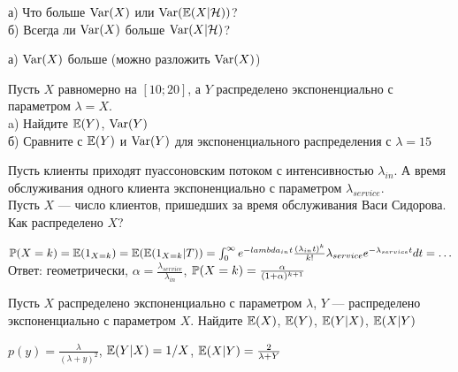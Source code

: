\begin{solution}
\begin{solution}
\begin{solution}
\begin{solution}
\begin{solution}
\begin{solution}
\begin{solution}
\begin{solution}
\end{solution}

\begin{problem}
а) Что больше $\Var(X)$ или $\Var(\E(X|\mathcal{H}))$? \\
б) Всегда ли $\Var(X)$ больше $\Var(X|\mathcal{H})$? 
\end{problem} 
\begin{solution} 

 а) $\Var(X)$ больше (можно разложить $\Var(X)$)
\end{solution}

\begin{problem}
Пусть $X$ равномерно на $[10;20]$, а $Y$ распределено экспоненциально с параметром $\lambda=X$. \\
a) Найдите $\E(Y)$, $\Var(Y)$ \\
б) Сравните с $\E(Y)$ и $\Var(Y)$ для экспоненциального распределения с $\lambda=15$ 
\end{problem} 
\begin{solution} 

\end{solution}

\begin{problem}
Пусть клиенты приходят пуассоновским потоком с интенсивностью $\lambda_{in}$. А время обслуживания одного клиента экспоненциально с параметром $\lambda_{service}$. \\
Пусть $X$ --- число клиентов, пришедших за время обслуживания Васи Сидорова. \\
Как распределено $X$? 
\end{problem} 
\begin{solution} 

$\P(X=k)=\E(1_{X=k})=\E(\E(1_{X=k}|T))=\int_{0}^{\infty}e^{-lambda_{in}t}\frac{(\lambda_{in}t)^{k}}{k!}\lambda_{service}e^{-\lambda_{service}t}dt=\ldots$ \\
Ответ: геометрически, $\alpha=\frac{\lambda_{service}}{\lambda_{in}}$, $\P(X=k)=\frac{\alpha}{(1+\alpha)^{k+1}}$ 
\end{solution}

\begin{problem}
Пусть $X$ распределено экспоненциально с параметром $\lambda$, $Y$ --- распределено экспоненциально с параметром $X$. Найдите $\E(X)$, $\E(Y)$, $\E(Y|X)$, $\E(X|Y)$ 
\end{problem} 
\begin{solution} 
 $p(y)=\frac{\lambda}{(\lambda+y)^{2}}$, $\E(Y|X)=1/X$, $\E(X|Y)=\frac{2}{\lambda+Y}$ 
\end{solution}


\end{solution}
\end{solution}
\end{solution}
\end{solution}
\end{solution}
\end{solution}
\end{solution}
